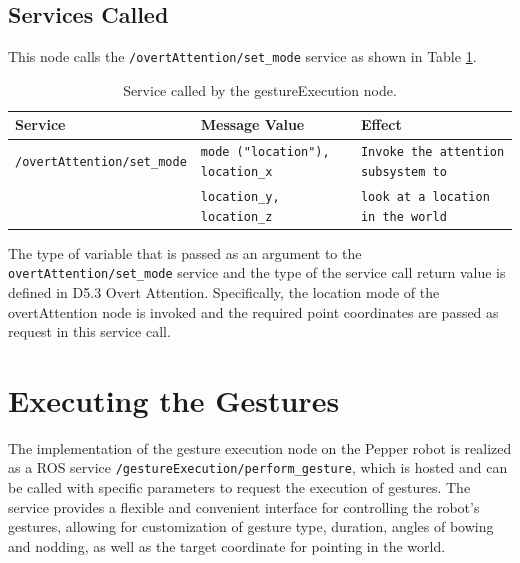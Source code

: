 \documentclass{CSSRforAfrica}
\begin{document}
\subsection*{Services Called}
This node calls the \texttt{/overtAttention/set\_mode} service as shown in Table \ref{tab:Called_services}.


\begin{longtable}[c]{|l|l|l|}
    \caption{Service called by the gestureExecution node.} \label{tab:Called_services} \\
    \hline
    \rowcolor{gray!30}
    \footnotesize{\textbf{Service}} & \footnotesize{\textbf{Message Value}} & \footnotesize{\textbf{Effect}} \\ \hline
    \endhead %
    
   \footnotesize{\texttt{/overtAttention/set\_mode}} & \footnotesize{\texttt{mode ("location"), location\_x}} &  \footnotesize{\texttt{Invoke the attention subsystem to}}  \\ 
   \footnotesize{} & \footnotesize{\texttt{location\_y, location\_z}} & \footnotesize{\texttt{look at a location in the world}}  \\\hline
\end{longtable}

The type of variable that is passed as an argument to the \texttt{overtAttention/set\_mode} service and the type of the service call return value is defined in D5.3 Overt Attention.  Specifically, the location mode of the overtAttention node is invoked and the required point coordinates are passed as request in this service call.

\newpage
\section{Executing the Gestures}
The implementation of the gesture execution node on the Pepper robot is realized as a ROS service \texttt{/gestureExecution/perform\_gesture}, which is hosted and can be called with specific parameters to request the execution of gestures. The service provides a flexible and convenient interface for controlling the robot's gestures, allowing for customization of gesture type, duration, angles of bowing and nodding, as well as the target coordinate for pointing in the world.
\end{document}
